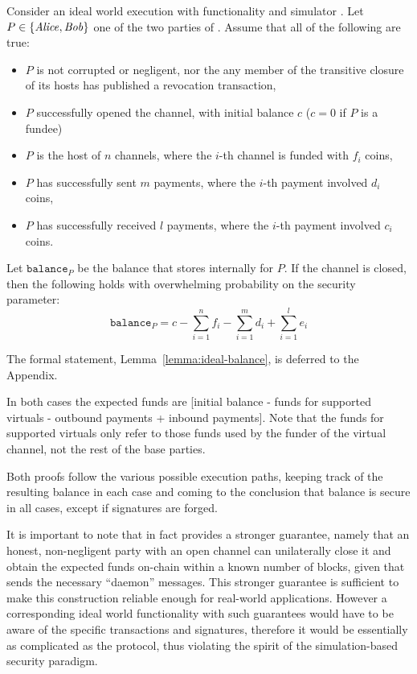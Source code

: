 \begin{lemma}
\label{lemma:ideal-balance-informal}
  Consider an ideal world execution with functionality \fchan and simulator
  \simulator. Let $P \in \{\mathit{Alice}, \mathit{Bob}\}$ one of the two parties of \fchan.
  Assume that all of the following are true:
  \begin{itemize}
    \item $P$ is not corrupted or negligent, nor the any member of the
    transitive closure of its hosts has published a revocation transaction,
    \item $P$ successfully opened the channel, with initial balance $c$ ($c = 0$
    if $P$ is a fundee)
    \item $P$ is the host of $n$ channels, where the $i$-th channel is funded
    with $f_i$ coins,
    \item $P$ has successfully sent $m$ payments, where the $i$-th payment
    involved $d_i$ coins,
    \item $P$ has successfully received $l$ payments, where the $i$-th payment
    involved $c_i$ coins.
  \end{itemize}
  Let $\texttt{balance}_P$ be the balance that \fchan stores internally for $P$.
  If the channel is closed, then the following holds with overwhelming
  probability on the security parameter:
  \begin{equation}
    \texttt{balance}_P = c - \sum\limits_{i=1}^n f_i -
    \sum\limits_{i=1}^m d_i + \sum\limits_{i=1}^l e_i
  \end{equation}
\end{lemma}
The formal statement, Lemma~\ref{lemma:ideal-balance}, is deferred to the
Appendix.

  In both cases the expected funds are [initial balance -
  funds for supported virtuals - outbound payments + inbound payments]. Note
  that the funds for supported virtuals only refer to those funds used by the
  funder of the virtual channel, not the rest of the base parties.

  Both proofs follow the various possible execution paths, keeping track of the
  resulting balance in each case and coming to the conclusion that balance is
  secure in all cases, except if signatures are forged.

  It is important to note that in fact \pchan provides a stronger guarantee,
  namely that an honest, non-negligent party with an open channel can
  unilaterally close it and obtain the expected funds on-chain within a known
  number of blocks, given that \environment sends the necessary ``daemon'' messages.
  This stronger guarantee is sufficient to make this construction reliable
  enough for real-world applications. However a corresponding ideal world
  functionality with such guarantees would have to be aware of the specific
  transactions and signatures, therefore it would be essentially as complicated
  as the protocol, thus violating the spirit of the simulation-based security
  paradigm.


